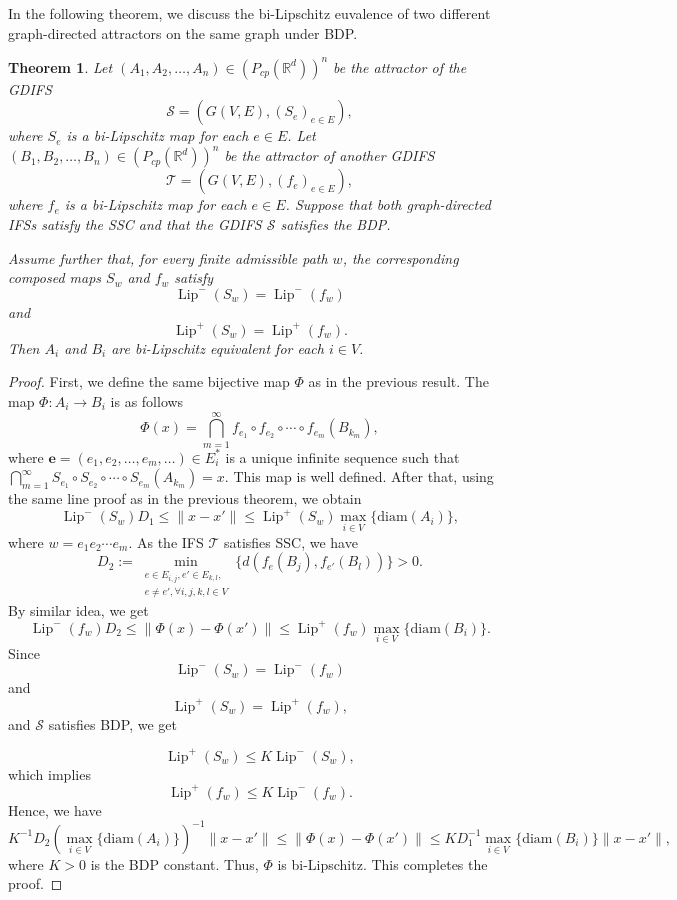 \documentclass[a4paper,12pt,reqno]{amsart}
\numberwithin{equation}{section}
\newtheorem{theorem}{Theorem}[section]
\theoremstyle{definition}
\theoremstyle{remark}
\numberwithin{equation}{section}
\begin{document}
In the following theorem, we discuss the bi-Lipschitz euvalence of two different graph-directed attractors on the same graph under BDP. 
\begin{theorem}
Let $(A_1,A_2,\ldots,A_n)\in (P_{cp}(\mathbb{R}^d))^n$ be the attractor of the GDIFS
\[
\mathcal S=(G(V,E),(S_e)_{e\in E}),
\]
where $S_e$ is a bi-Lipschitz map for each $e\in E$. Let
$(B_1,B_2,\ldots,B_n)\in (P_{cp}(\mathbb{R}^d))^n$ be the attractor of another GDIFS
\[
\mathcal T=(G(V,E),(f_e)_{e\in E}),
\]
where $f_e$ is a bi-Lipschitz map for each $e\in E$. Suppose that both graph-directed IFSs satisfy the SSC and that the GDIFS $\mathcal S$ satisfies the BDP.

Assume further that, for every finite admissible path $w$, the corresponding composed maps $S_w$ and $f_w$ satisfy
\[
\operatorname{Lip}^{-}(S_w)=\operatorname{Lip}^{-}(f_w)
\]
and
\[
\operatorname{Lip}^{+}(S_w)=\operatorname{Lip}^{+}(f_w).
\]
Then $A_i$ and $B_i$ are bi-Lipschitz equivalent for each $i\in V$.
\end{theorem}
\begin{proof}
First, we define the same bijective map $\Phi$ as in the previous result. The map $\Phi: A_i\to B_i $ is as follows $$\Phi(x)=\bigcap_{m=1}^{\infty} f_{e_1} \circ f_{e_2}\circ \cdots  \circ f_{e_m}(B_{k_m}),$$
where $\mathbf{e}=(e_1,e_2,\dots,e_m,\dots)\in E_{i}^*$ is a unique infinite sequence such that  $\bigcap_{m=1}^{\infty} S_{e_1} \circ S_{e_2}\circ \cdots  \circ S_{e_m}(A_{k_m})= x$. This map is well defined. After that, using the same line proof as in the previous theorem, we obtain
$$\operatorname{Lip}^{-}(S_w) D_1\leq \|x-x'\|\leq \operatorname{Lip}^{+}(S_w) \max_{i\in V}\{\text{diam}(A_i)\},$$ where $w=e_1e_2\cdots e_m.$
As the IFS $\mathcal{T}$ satisfies SSC, we have $$D_2:=\min\limits_{\substack{e\in E_{i,j},e'\in E_{k,l},\\ e\ne e', \forall i,j,k,l\in V}}\{d(f_{e}(B_j), f_{e'}(B_l))\}>0.$$
By similar idea, we get
$$\operatorname{Lip}^{-}(f_w) D_2\leq \|\Phi(x)-\Phi(x')\|\leq \operatorname{Lip}^{+}(f_w) \max_{i\in V}\{\text{diam}(B_i)\}.$$
Since
\[
\operatorname{Lip}^{-}(S_w)=\operatorname{Lip}^{-}(f_w)
\]
and
\[
\operatorname{Lip}^{+}(S_w)=\operatorname{Lip}^{+}(f_w),
\]
and $\mathcal{S}$ satisfies BDP, we get 

$$\operatorname{Lip}^{+}(S_w) \le K \operatorname{Lip}^{-}(S_w),$$ which implies
$$\operatorname{Lip}^{+}(f_w) \le K \operatorname{Lip}^{-}(f_w).$$
Hence, we have
$$K^{-1} D_{2} ( \max_{i\in V}\{\text{diam}(A_i)\})^{-1}\|x-x'\|\leq \|\Phi(x)-\Phi(x')\|\leq K D_1^{-1} \max_{i\in V}\{\text{diam}(B_i)\}\|x-x'\|,$$ where $K>0$ is the BDP constant. Thus, $\Phi$ is bi-Lipschitz. This completes the proof.
\end{proof}
\end{document}
